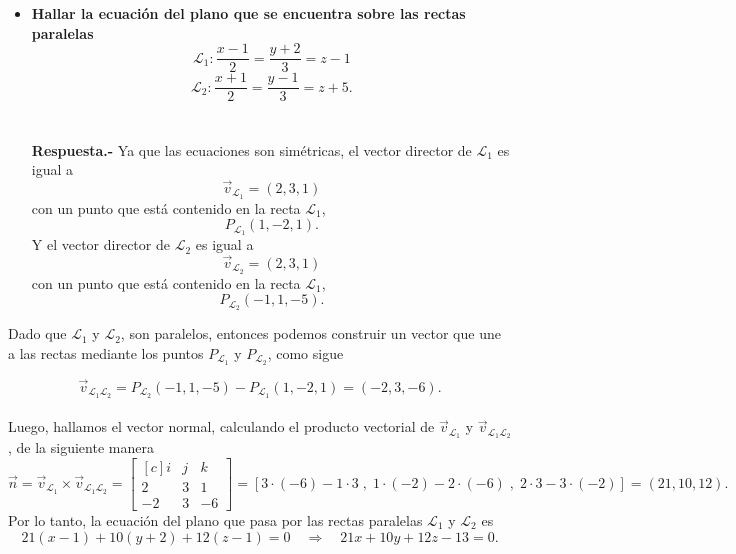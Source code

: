 \begin{itemize}
    \item \textbf{\boldmath Hallar la ecuación del plano que se encuentra sobre las rectas paralelas
    $$\mathscr{L}_1: \dfrac{x-1}{2}=\dfrac{y+2}{3}=z-1$$
    $$\mathscr{L}_2: \dfrac{x+1}{2}=\dfrac{y-1}{3}=z+5.$$\\\\
Respuesta.-}\; Ya que las ecuaciones son simétricas, el vector director de $\mathscr{L}_1$ es igual a 
$$\vec{v}_{\mathscr{L}_1}=(2,3,1)$$ 
con un punto que está contenido en la recta $\mathscr{L}_1$, $$P_{\mathscr{L}_1}(1,-2,1).$$
Y el vector director de $\mathscr{L}_2$ es igual a 
$$\vec{v}_{\mathscr{L}_2}=(2,3,1)$$ 
con un punto que está contenido en la recta $\mathscr{L}_1$, $$P_{\mathscr{L}_2}(-1,1,-5).$$
\end{itemize}
Dado que $\mathscr{L}_1$ y $\mathscr{L}_2$, son paralelos, entonces podemos construir un vector que une a las rectas mediante los puntos $P_{\mathscr{L}_1}$ y $P_{\mathscr{L}_2}$, como sigue

$$\vec{v}_{\mathscr{L}_1\mathscr{L}_2}=P_{\mathscr{L}_2}(-1,1,-5)-P_{\mathscr{L}_1}(1,-2,1)=(-2,3,-6).$$\\
Luego, hallamos el vector normal, calculando el producto vectorial de $\vec{v}_{\mathscr{L}_1}$ y $\vec{v}_{\mathscr{L}_1\mathscr{L}_2}$, de la siguiente manera
$$\vec{n}=\vec{v}_{\mathscr{L}_1}\times \vec{v}_{\mathscr{L}_1\mathscr{L}_2}=\begin{bmatrix*}[c]
    i&j&k\\
    2&3&1\\
    -2&3&-6
\end{bmatrix*} = \left[3\cdot(-6)-1\cdot3\;,\;1\cdot(-2)-2\cdot(-6)\;,\;2\cdot3-3\cdot(-2)\right]=(21,10,12).$$
Por lo tanto, la ecuación del plano que pasa por las rectas paralelas $\mathscr{L}_1$ y $\mathscr{L}_2$ es
$$21(x-1)+10(y+2)+12(z-1)=0\quad \Rightarrow \quad 21x+10y+12z-13=0.$$
